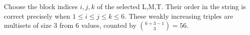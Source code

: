 Choose the block indices $i,j,k$ of the selected L,M,T. Their order in the string is correct precisely when $1\le i\le j\le k\le6$. These weakly increasing triples are multisets of size 3 from 6 values, counted by $\binom{6+3-1}3=\boxed{56}$.

